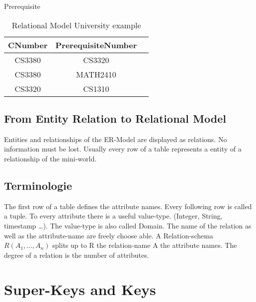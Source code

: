 \begin{table}[h]
Prerequisite\\
\begin{tabular}{|c|c|c|}
\hline
CNumber & PrerequisiteNumber\\
\hline
CS3380 & CS3320\\
\hline
CS3380 & MATH2410\\
\hline
CS3320 & CS1310\\
\hline
\end{tabular}

\caption{Relational Model University example}
\label{tab:is:rm:uniexample}
\end{table}

\subsection{From Entity Relation to Relational Model}
Entities and relationships of the ER-Model are displayed as relations. No
information must be lost. Usually every row of a table represents a entity of a
relationship of the mini-world.

\subsection{Terminologie}
The first row of a table defines the attribute names. Every following row
is called a tuple. To every attribute there is a useful value-type. (Integer,
String, timestamp \dots). The value-type is also called Domain. The name of the
relation as well as the attribute-name are freely choose able. A
Relation-schema $R(A_1, \dots , A_n)$ splits up to R the relation-name A the
attribute names. The degree of a relation is the number of attributes.

\section{Super-Keys and Keys}
